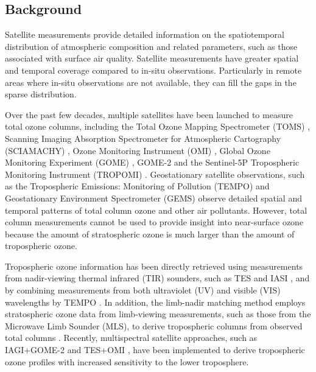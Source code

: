 \documentclass[gmd, manuscript]{copernicus}
\begin{document}
\subsection{Background}
Satellite measurements provide detailed information on the spatiotemporal distribution of atmospheric composition and related parameters, such as those associated with surface air quality. Satellite measurements have greater spatial and temporal coverage compared to in-situ observations. Particularly in remote areas where in-situ observations are not available, they can fill the gaps in the sparse distribution. 

Over the past few decades, multiple satellites have been launched to measure total ozone columns, including the Total Ozone Mapping Spectrometer (TOMS) \citep{prospero_environmental_2002}, Scanning Imaging Absorption Spectrometer for Atmospheric Cartography (SCIAMACHY) \citep{bovensmann_sciamachy_1999}, Ozone Monitoring Instrument (OMI) \citep{veefkind_total_2006}, Global Ozone Monitoring Experiment (GOME) \citep{coldewey-egbers_total_2005}, GOME-2 \citep{loyola_gome-2_2011} and the Sentinel-5P Tropospheric Monitoring Instrument (TROPOMI) \citep{garane_tropomis5p_2019}. Geostationary satellite observations, such as the Tropospheric Emissions: Monitoring of Pollution (TEMPO) \citep{Naeger2021} and Geostationary Environment Spectrometer (GEMS) \citep{baek_evaluation_2023} observe detailed spatial and temporal patterns of total column ozone and other air pollutants. However, total column measurements cannot be used to provide insight into near-surface ozone because the amount of stratospheric ozone is much larger than the amount of tropospheric ozone. 

Tropospheric ozone information has been directly retrieved using measurements from nadir-viewing thermal infrared (TIR) sounders, such as TES \citep{bowman_capturing_2002} and IASI \citep{boynard_measurements_2009}, and by combining measurements from both ultraviolet (UV) and visible (VIS) wavelengths by TEMPO \citep{johnson_evaluation_2018}. In addition, the limb-nadir matching method employs stratospheric ozone data from limb-viewing measurements, such as those from the Microwave Limb Sounder (MLS), to derive tropospheric columns from observed total columns \citep{ziemke_trends_2019}. Recently, multispectral satellite approaches, such as IAGI+GOME-2 \citep{cuesta_transboundary_2018} and TES+OMI \citep{colombi_new_2021}, have been implemented to derive tropospheric ozone profiles with increased sensitivity to the lower troposphere.  
\end{document}
